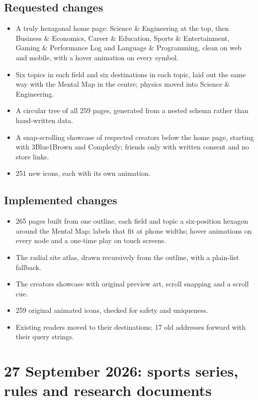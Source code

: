 \documentclass[11pt]{article}
\begin{document}
\subsection{Requested changes}
\begin{itemize}
\item A truly hexagonal home page: Science \& Engineering at the top, then Business \& Economics, Career \& Education, Sports \& Entertainment, Gaming \& Performance Log and Language \& Programming, clean on web and mobile, with a hover animation on every symbol.
\item Six topics in each field and six destinations in each topic, laid out the same way with the Mental Map in the centre; physics moved into Science \& Engineering.
\item A circular tree of all 259 pages, generated from a nested schema rather than hand-written data.
\item A snap-scrolling showcase of respected creators below the home page, starting with 3Blue1Brown and Complexly; friends only with written consent and no store links.
\item 251 new icons, each with its own animation.
\end{itemize}
\subsection{Implemented changes}
\begin{itemize}
\item 265 pages built from one outline, each field and topic a six-position hexagon around the Mental Map; labels that fit at phone widths; hover animations on every node and a one-time play on touch screens.
\item The radial site atlas, drawn recursively from the outline, with a plain-list fallback.
\item The creators showcase with original preview art, scroll snapping and a scroll cue.
\item 259 original animated icons, checked for safety and uniqueness.
\item Existing readers moved to their destinations; 17 old addresses forward with their query strings.
\end{itemize}

\section{27 September 2026: sports series, rules and research documents}
\end{document}
